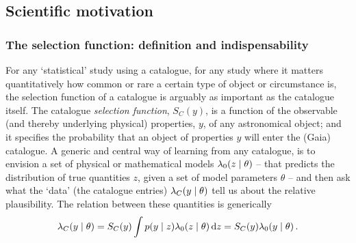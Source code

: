 \subsection{Scientific motivation}
\label{sec:scientific-motivation}

\subsubsection{The selection function: definition and indispensability}

For any `statistical' study using a catalogue, for any study where it matters quantitatively how common or rare a certain type of object or circumstance is, the selection function of a catalogue is arguably as important as the catalogue itself. The catalogue \textit{selection function}, $S_C(y)$, is a function of the observable (and thereby underlying physical) properties, $y$, of any astronomical object; and it specifies the probability that an object of properties $y$ will enter the (Gaia) catalogue. A generic and central way of learning from any catalogue, is to envision a set of physical or mathematical models $\lambda_0(z\mid\theta)$ -- that predicts the
distribution of true quantities $z$, given a set of model parameters $\theta$ -- and then ask
what the `data' (the catalogue entries) $\lambda_C(y\mid\theta)$ tell us about the relative plausibility. 
The relation between these quantities is generically
\begin{equation}
\lambda_C(y\mid\theta) = S_C(y)\int p(y\mid z)\lambda_0(z\mid\theta)\,{\textrm{d}} z = S_C(y)\lambda_0(y\mid\theta)\,.
\label{eqn:selfunc_definition}
\end{equation}

